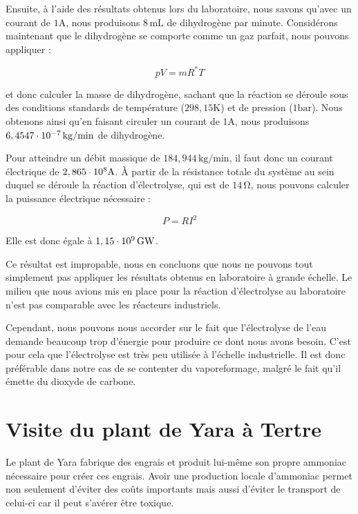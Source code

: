 \documentclass[a4paper, oneside, 12pt]{article}
\begin{document}
Ensuite, à l'aide des résultats obtenus lors du laboratoire, nous savons qu'avec 
un courant de $1 \si{\ampere}$, nous produisons $8 \, \si{\milli\liter}$ de dihydrogène 
par minute. Considérons maintenant que le dihydrogène se comporte comme un gaz parfait, 
nous pouvons appliquer :

\begin{equation*}
	pV = mR^{*}T
\end{equation*}

et donc calculer la masse de dihydrogène, sachant que la réaction se déroule 
sous des conditions standards de température ($298,15 \si{\kelvin}$) et de 
pression ($1 \si{\bar}$). Nous obtenons ainsi qu'en faisant circuler un courant 
de $1 \si{\ampere}$, nous produisons $6,4547\cdot 10^{-7} \, \si{\kilo\gram/\minute}$ de dihydrogène.

Pour atteindre un débit massique de $184,944 \, \si{\kilo\gram/\minute}$, 
il faut donc un courant électrique de $2,865\cdot 10^{8} \si{\ampere}$. 
À partir de la résistance totale du système au sein duquel se déroule 
la réaction d'électrolyse, qui est de $14 \, \si{\ohm}$, nous pouvons calculer
la puissance électrique nécessaire : 

\begin{equation*}
	P = RI^{2}
\end{equation*}

Elle est donc égale à $1,15\cdot 10^{9} \, \si{\giga\watt}$.

Ce résultat est impropable, nous en concluons que nous ne pouvons tout simplement pas 
appliquer les résultats obtenus en laboratoire à grande échelle. Le milieu que nous 
avions mis en place pour la réaction d'électrolyse au laboratoire n'est pas 
comparable avec les réacteurs industriels.

Cependant, nous pouvons nous accorder sur le fait que l'électrolyse de l'eau demande 
beaucoup trop d'énergie pour produire ce dont nous avons besoin. 
C'est pour cela que l'électrolyse est très peu utilisée à l'échelle industrielle. 
Il est donc préférable dans notre cas de se contenter du vaporeformage, 
malgré le fait qu'il émette du dioxyde de carbone.

\section{Visite du plant de Yara à Tertre}

Le plant de Yara fabrique des engrais et produit lui-même son propre ammoniac nécessaire
pour créer ces engrais. Avoir une production locale d'ammoniac permet non seulement 
d'éviter des coûts importants mais aussi d'éviter le transport de celui-ci car il 
peut s'avérer être toxique.
\end{document}
